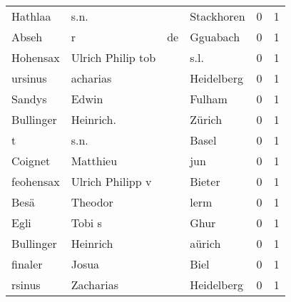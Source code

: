 \begin{tabular}{llllrr}
                  Hathlaa &                               s.n. &             &                                  Stackhoren &          0 &         1 \\
                    Abseh &                                  r &          de &                                    Gguabach &          0 &         1 \\
                 Hohensax &                  Ulrich Philip tob &             &                                        s.l. &          0 &         1 \\
                  ursinus &                           acharias &             &                                  Heidelberg &          0 &         1 \\
                   Sandys &                              Edwin &             &                                      Fulham &          0 &         1 \\
                Bullinger &                          Heinrich. &             &                                      Zürich &          0 &         1 \\
                        t &                               s.n. &             &                                       Basel &          0 &         1 \\
                  Coignet &                           Matthieu &             &                                         jun &          0 &         1 \\
                feohensax &                   Ulrich Philipp v &             &                                      Bieter &          0 &         1 \\
                     Besä &                            Theodor &             &                                        lerm &          0 &         1 \\
                     Egli &                             Tobi s &             &                                        Ghur &          0 &         1 \\
                Bullinger &                           Heinrich &             &                                      aürich &          0 &         1 \\
                  finaler &                              Josua &             &                                        Biel &          0 &         1 \\
                   rsinus &                          Zacharias &             &                                  Heidelberg &          0 &         1 \\

\end{tabular}
